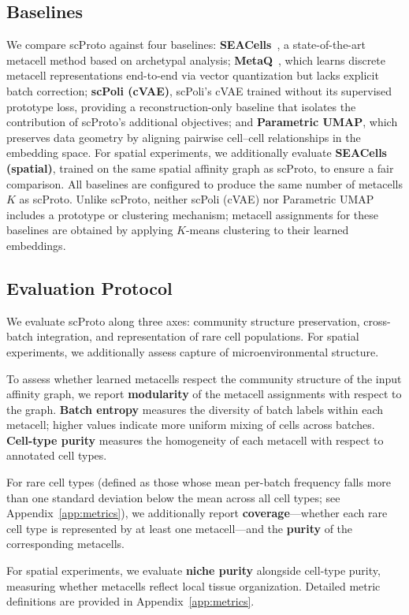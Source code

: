 \subsection{Baselines}

We compare scProto against four baselines:
\textbf{SEACells}~\citep{seacells}, a state-of-the-art metacell method based on archetypal analysis;
\textbf{MetaQ}~\citep{metaq}, which learns discrete metacell representations end-to-end via vector quantization but lacks explicit batch correction;
\textbf{scPoli (cVAE)}, scPoli's cVAE trained without its supervised prototype loss, providing a reconstruction-only baseline that isolates the contribution of scProto's additional objectives;
and \textbf{Parametric UMAP}, which preserves data geometry by aligning pairwise cell--cell relationships in the embedding space.
For spatial experiments, we additionally evaluate \textbf{SEACells (spatial)}, trained on the same spatial affinity graph as scProto, to ensure a fair comparison.
All baselines are configured to produce the same number of metacells $K$ as scProto.
Unlike scProto, neither scPoli (cVAE) nor Parametric UMAP includes a prototype or clustering mechanism; metacell assignments for these baselines are obtained by applying $K$-means clustering to their learned embeddings.

\subsection{Evaluation Protocol}

We evaluate scProto along three axes: community structure preservation, cross-batch integration, and representation of rare cell populations.
For spatial experiments, we additionally assess capture of microenvironmental structure.

To assess whether learned metacells respect the community structure of the input affinity graph, we report \textbf{modularity} of the metacell assignments with respect to the graph.
\textbf{Batch entropy} measures the diversity of batch labels within each metacell; higher values indicate more uniform mixing of cells across batches.
\textbf{Cell-type purity} measures the homogeneity of each metacell with respect to annotated cell types.

For rare cell types (defined as those whose mean per-batch frequency falls more than one standard deviation below the mean across all cell types; see Appendix~\ref{app:metrics}), we additionally report \textbf{coverage}---whether each rare cell type is represented by at least one metacell---and the \textbf{purity} of the corresponding metacells.

For spatial experiments, we evaluate \textbf{niche purity} alongside cell-type purity, measuring whether metacells reflect local tissue organization.
Detailed metric definitions are provided in Appendix~\ref{app:metrics}.
